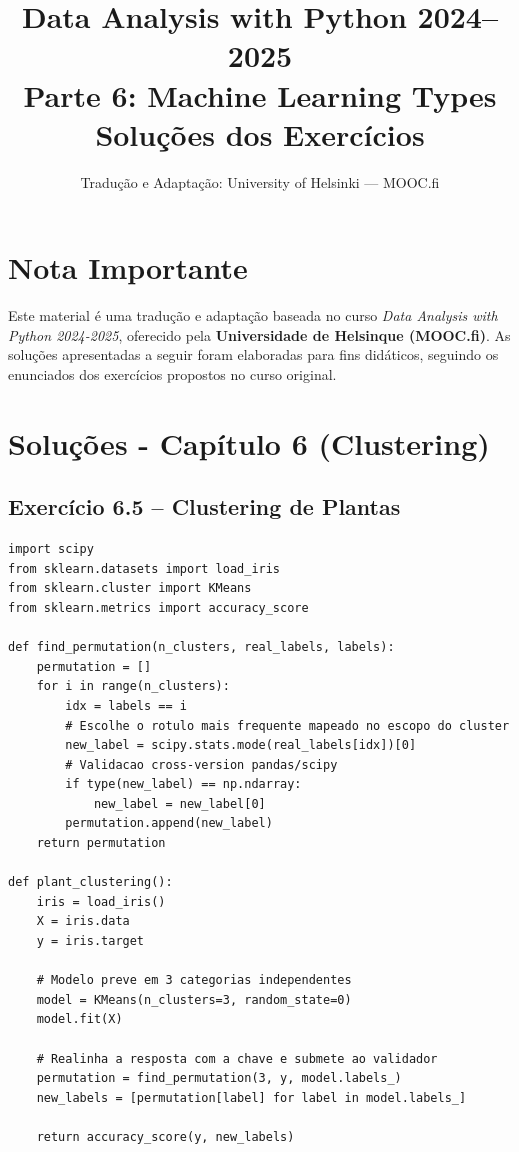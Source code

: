 \documentclass[11pt,a4paper]{article}
\title{\textbf{Data Analysis with Python 2024--2025}\\Parte 6: Machine Learning Types\\\large Soluções dos Exercícios}
\author{Tradução e Adaptação: University of Helsinki --- MOOC.fi}
\date{}
\begin{document}
\maketitle

\section*{Nota Importante}
Este material é uma tradução e adaptação baseada no curso \textit{Data Analysis with Python 2024-2025}, oferecido pela \textbf{Universidade de Helsinque (MOOC.fi)}. As soluções apresentadas a seguir foram elaboradas para fins didáticos, seguindo os enunciados dos exercícios propostos no curso original.

\tableofcontents
\newpage

\section{Soluções - Capítulo 6 (Clustering)}

\subsection*{Exercício 6.5 -- Clustering de Plantas}

\begin{solucao}
\begin{lstlisting}
import scipy
from sklearn.datasets import load_iris
from sklearn.cluster import KMeans
from sklearn.metrics import accuracy_score

def find_permutation(n_clusters, real_labels, labels):
    permutation = []
    for i in range(n_clusters):
        idx = labels == i
        # Escolhe o rotulo mais frequente mapeado no escopo do cluster
        new_label = scipy.stats.mode(real_labels[idx])[0]
        # Validacao cross-version pandas/scipy
        if type(new_label) == np.ndarray:
            new_label = new_label[0]
        permutation.append(new_label)
    return permutation

def plant_clustering():
    iris = load_iris()
    X = iris.data
    y = iris.target
    
    # Modelo preve em 3 categorias independentes
    model = KMeans(n_clusters=3, random_state=0)
    model.fit(X)
    
    # Realinha a resposta com a chave e submete ao validador
    permutation = find_permutation(3, y, model.labels_)
    new_labels = [permutation[label] for label in model.labels_]
    
    return accuracy_score(y, new_labels)
\end{lstlisting}
\end{solucao}
\end{document}
